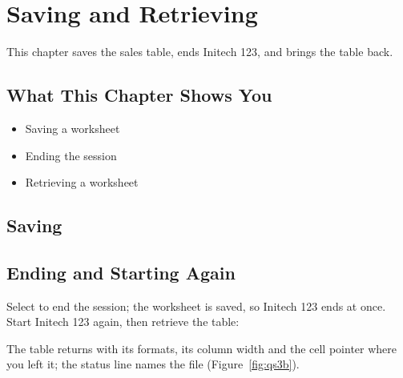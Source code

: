 \chapter{Saving and Retrieving}

This chapter saves the sales table, ends Initech 123, and brings the table
back.

\section{What This Chapter Shows You}
\begin{itemize}
\item Saving a worksheet
\item Ending the session
\item Retrieving a worksheet
\end{itemize}

\section{Saving}
\begin{Keystrokes}
\end{Keystrokes}

\section{Ending and Starting Again}
Select  to end the session; the worksheet is saved, so
Initech 123 ends at once.  Start Initech 123 again, then retrieve the
table:
\begin{Keystrokes}
\end{Keystrokes}
The table returns with its formats, its column width and the cell pointer
where you left it; the status line names the file
(Figure~\ref{fig:qs3b}).


